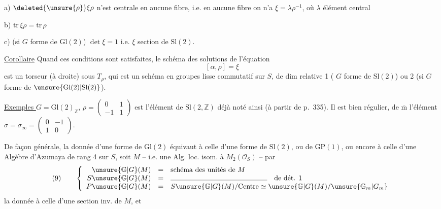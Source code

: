 a) $\deleted{\unsure{\rho}}\xi\rho$ n'est centrale en aucune fibre, i.e. en aucune fibre on n'a $\xi=\lambda\rho^{-1}$, où $\lambda$  élément central

b) $\mathrm{tr}\,\xi\rho=\mathrm{tr}\,\rho$

c) (si $G$ forme de $\mathrm{Gl}(2)$) $\det\xi=1$ i.e. $\xi$ section de $\mathrm{Sl}(2)$.


\uline{Corollaire} Quand ces conditions sont satisfaites, le schéma des solutions  de l'équation
\[
[\alpha,\rho]=\xi
\]
est un torseur (à droite) sous $T_\rho$, qui est un schéma en groupes lisse commutatif sur $S$, de dim relative 1 ( $G$ forme de $\mathrm{Sl}(2)$) ou 2 (si $G$ forme de $\unsure{\mathrm{Gl}(2)|\mathrm{Sl}(2)}$).

\uline{Exemples } $G=\mathrm{Gl}(2)_{\mathbb Z}$, $\rho=\begin{pmatrix}0&1\\-1&1\end{pmatrix}$ est l'élément de $\mathrm{Sl}(2,\mathbb Z)$ déjà noté ainsi (à partir de p.~335). Il est bien régulier,  de $\overline{\mathrm m}$ l'élément $\sigma=\sigma_\infty=\begin{pmatrix}0&-1\\1&0\end{pmatrix}$.

De façon générale, la donnée d'une forme de $\mathrm{Gl}(2)$ équivaut à celle d'une forme de $\mathrm{Sl}(2)$, ou de $\mathrm{GP}(1)$, ou encore à celle d'une Algèbre d'Azumaya de rang 4 sur $S$, soit $M$ -- i.e. une Alg. loc.  isom. à $M_2(\mathcal O_S)$ -- par
\[
(9)\qquad
\left\{
\begin{array}{rcl}
\unsure{\mathbb G|G}(M)&=&\text{schéma des unités de }M\\
S\unsure{\mathbb G|G}(M)&=&\rule{4.8cm}{0.3pt}\quad\text{de dét. }1\\
P\unsure{\mathbb G|G}(M)&=&S\unsure{\mathbb G|G}(M)/\mathrm{Centre}\simeq\unsure{\mathbb G|G}(M)/\unsure{\mathbb G_m|G_m}
\end{array}
\right.
\]
 la donnée   à celle d'une section inv. de $M$, et

